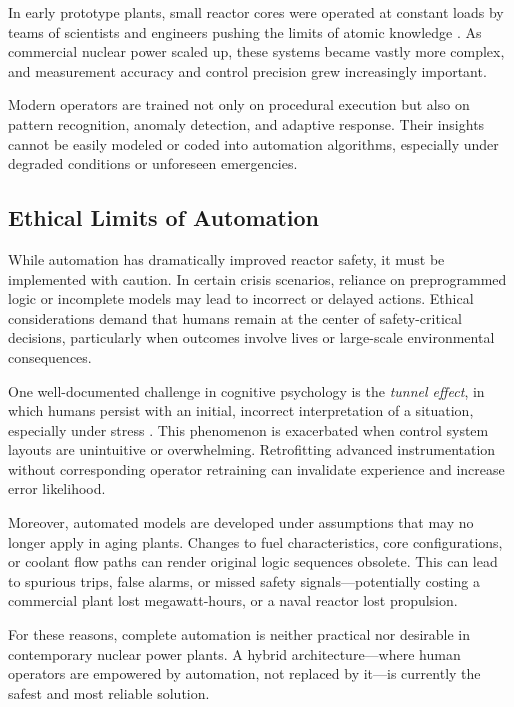 \documentclass[12pt]{article}
\begin{document}
In early prototype plants, small reactor cores were operated at constant loads by teams of scientists and engineers pushing the limits of atomic knowledge \autocite{moderninstruments}. As commercial nuclear power scaled up, these systems became vastly more complex, and measurement accuracy and control precision grew increasingly important.

Modern operators are trained not only on procedural execution but also on pattern recognition, anomaly detection, and adaptive response. Their insights cannot be easily modeled or coded into automation algorithms, especially under degraded conditions or unforeseen emergencies.

\subsection{Ethical Limits of Automation}

While automation has dramatically improved reactor safety, it must be implemented with caution. In certain crisis scenarios, reliance on preprogrammed logic or incomplete models may lead to incorrect or delayed actions. Ethical considerations demand that humans remain at the center of safety-critical decisions, particularly when outcomes involve lives or large-scale environmental consequences.

One well-documented challenge in cognitive psychology is the \textit{tunnel effect}, in which humans persist with an initial, incorrect interpretation of a situation, especially under stress \autocite{moderninstruments}. This phenomenon is exacerbated when control system layouts are unintuitive or overwhelming. Retrofitting advanced instrumentation without corresponding operator retraining can invalidate experience and increase error likelihood.

Moreover, automated models are developed under assumptions that may no longer apply in aging plants. Changes to fuel characteristics, core configurations, or coolant flow paths can render original logic sequences obsolete. This can lead to spurious trips, false alarms, or missed safety signals—potentially costing a commercial plant lost megawatt-hours, or a naval reactor lost propulsion.

For these reasons, complete automation is neither practical nor desirable in contemporary nuclear power plants. A hybrid architecture—where human operators are empowered by automation, not replaced by it—is currently the safest and most reliable solution.
\end{document}
